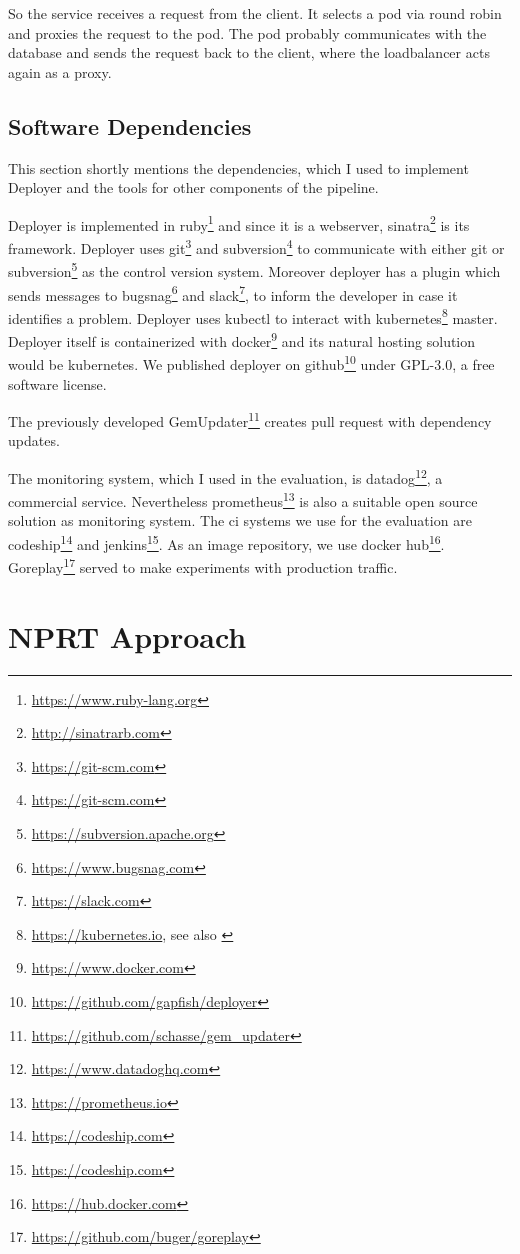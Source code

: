 So the service receives a request from the client. It selects a pod via round robin and
proxies the request to the pod. The pod probably communicates with the database and sends
the request back to the client, where the loadbalancer acts again as a proxy.

\section{Software Dependencies}

This section shortly mentions the dependencies, which I used to implement Deployer and the
tools for other components of the pipeline.

Deployer is implemented in ruby\footnote{\url{https://www.ruby-lang.org}} and since it is
a webserver, sinatra\footnote{\url{http://sinatrarb.com}} is its framework. Deployer uses
git\footnote{\url{https://git-scm.com}} and subversion\footnote{\url{https://git-scm.com}}
to communicate with either git or subversion\footnote{\url{https://subversion.apache.org}}
as the control version system. Moreover deployer has a plugin which sends messages to
bugsnag\footnote{\url{https://www.bugsnag.com}} and
slack\footnote{\url{https://slack.com}}, to inform the developer in case it identifies a
problem. Deployer uses kubectl to interact with
kubernetes\footnote{\url{https://kubernetes.io}, see also
  \cite{kubernetes_architecture,kubernetes_architecture2}} master. Deployer itself is
containerized with docker\footnote{\url{https://www.docker.com}} and its natural hosting
solution would be kubernetes. We published deployer on
github\footnote{\url{https://github.com/gapfish/deployer}} under GPL-3.0, a free software
license.

The previously developed GemUpdater\footnote{\url{https://github.com/schasse/gem_updater}}
creates pull request with dependency updates.

The monitoring system, which I used in the evaluation, is
datadog\footnote{\url{https://www.datadoghq.com}}, a commercial service. Nevertheless
prometheus\footnote{\url{https://prometheus.io}} is also a suitable open source solution
as monitoring system. The \gls{ci} systems we use for the evaluation are
codeship\footnote{\url{https://codeship.com}} and
jenkins\footnote{\url{https://codeship.com}}. As an image repository, we use docker
hub\footnote{\url{https://hub.docker.com}}. Goreplay\footnote{\url{https://github.com/buger/goreplay}}
served to make experiments with production traffic.

\chapter{NPRT Approach}
\label{chap:macro}

